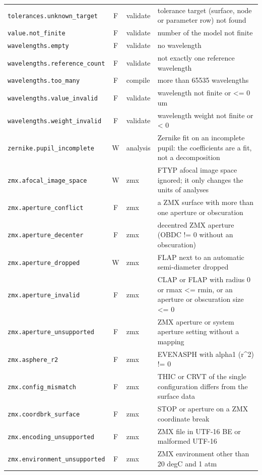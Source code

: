 \documentclass[11pt,a4paper,openany]{book}
\begin{document}
{\begin{longtable}{@{}L{6.1cm}cL{1.3cm}L{6.9cm}@{}}
\texttt{tolerances.unknown\_target} & F & validate & tolerance target (surface, node or parameter row) not found \\
\texttt{value.not\_finite} & F & validate & number of the model not finite \\
\texttt{wavelengths.empty} & F & validate & no wavelength \\
\texttt{wavelengths.reference\_count} & F & validate & not exactly one reference wavelength \\
\texttt{wavelengths.too\_many} & F & compile & more than 65535 wavelengths \\
\texttt{wavelengths.value\_invalid} & F & validate & wavelength not finite or <= 0 um \\
\texttt{wavelengths.weight\_invalid} & F & validate & wavelength weight not finite or < 0 \\
\texttt{zernike.pupil\_incomplete} & W & analysis & Zernike fit on an incomplete pupil: the coefficients are a fit, not a decomposition \\
\texttt{zmx.afocal\_image\_space} & W & zmx & FTYP afocal image space ignored; it only changes the units of analyses \\
\texttt{zmx.aperture\_conflict} & F & zmx & a ZMX surface with more than one aperture or obscuration \\
\texttt{zmx.aperture\_decenter} & F & zmx & decentred ZMX aperture (OBDC != 0 without an obscuration) \\
\texttt{zmx.aperture\_dropped} & W & zmx & FLAP next to an automatic semi-diameter dropped \\
\texttt{zmx.aperture\_invalid} & F & zmx & CLAP or FLAP with radius 0 or rmax <= rmin, or an aperture or obscuration size <= 0 \\
\texttt{zmx.aperture\_unsupported} & F & zmx & ZMX aperture or system aperture setting without a mapping \\
\texttt{zmx.asphere\_r2} & F & zmx & EVENASPH with alpha1 (r\textasciicircum{}2) != 0 \\
\texttt{zmx.config\_mismatch} & F & zmx & THIC or CRVT of the single configuration differs from the surface data \\
\texttt{zmx.coordbrk\_surface} & F & zmx & STOP or aperture on a ZMX coordinate break \\
\texttt{zmx.encoding\_unsupported} & F & zmx & ZMX file in UTF-16 BE or malformed UTF-16 \\
\texttt{zmx.environment\_unsupported} & F & zmx & ZMX environment other than 20 degC and 1 atm \\

\end{longtable}}
\end{document}
